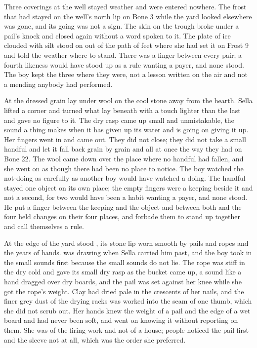 Three coverings at the well stayed weather and were entered nowhere. The frost that had stayed on the well's north lip on Bone 3 while the yard looked elsewhere was gone, and its going was not a sign. The skin on the trough broke under a pail's knock and closed again without a word spoken to it. The plate of ice clouded with silt stood on  out of the path of feet where she had set it on Frost 9 and told the weather where to stand. There was a finger between every pair; a fourth likeness would have stood up as a rule wanting a payer, and none stood. The boy kept the three where they were, not a lesson written on the air and not a mending anybody had performed.

\scenebreak

At  the dressed grain lay under wool on the cool stone away from the hearth. Sella lifted a corner and turned what lay beneath with a touch lighter than the last and gave no figure to it. The dry rasp came up small and unmistakable, the sound a thing makes when it has given up its water and is going on giving it up. Her fingers went in and came out. They did not close; they did not take a small handful and let it fall back grain by grain and all at once the way they had on Bone 22. The wool came down over the place where no handful had fallen, and she went on as though there had been no place to notice. The boy watched the not-doing as carefully as another boy would have watched a doing. The handful stayed one object on its own place; the empty fingers were a keeping beside it and not a second, for two would have been a habit wanting a payer, and none stood. He put a finger between the keeping and the object and between both and the four held changes on their four places, and forbade them to stand up together and call themselves a rule.

At the edge of the yard stood , its stone lip worn smooth by pails and ropes and the years of hands.  was drawing when Sella carried him past, and the boy took in the small sounds first because the small sounds do not lie. The rope was stiff in the dry cold and gave its small dry rasp as the bucket came up, a sound like a hand dragged over dry boards, and the pail was set against her knee while she got the rope's weight. Clay had dried pale in the crescents of her nails, and the finer grey dust of the drying racks was worked into the seam of one thumb, which she did not scrub out. Her hands knew the weight of a pail and the edge of a wet board and had never been soft, and went on knowing it without reporting on them. She was of the firing work and not of a house; people noticed the pail first and the sleeve not at all, which was the order she preferred.

